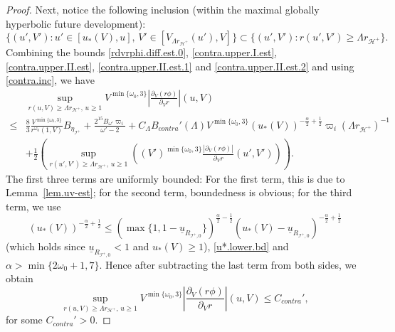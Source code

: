 \documentclass[10pt, reqno]{amsart}
\theoremstyle{definition}
\theoremstyle{remark}
\theoremstyle{conjecture}
\numberwithin{equation}{section}
\newcommand{\rd}{\partial}
\newcommand{\0}{\emptyset}
\newcommand{\alp}{\alpha}
\newcommand{\omg}{\omega}
\newcommand{\calH}{\mathcal H}
\newcommand{\calI}{\mathcal I}
\newcommand{\f}{\frac}
\newcommand{\EH}{\calH^{+}}
\newcommand{\NI}{\calI^{+}}						%
\newcommand{\ub}{\underline{u}}
\begin{document}
\begin{proof}
Next, notice the following inclusion (within the maximal globally hyperbolic future development):
\begin{equation}\label{contra.inc}
\{(u',V'): u'\in [u_*(V),u],\,V'\in [V_{\Lambda r_{\EH}}(u'),V]\} \subset \{(u',V'): r(u', V')\geq \Lambda r_{\EH}\}.
\end{equation}
Combining the bounds \eqref{rdvrphi.diff.est.0}, \eqref{contra.upper.I.est}, \eqref{contra.upper.II.est}, \eqref{contra.upper.II.est.1} and \eqref{contra.upper.II.est.2} and using \eqref{contra.inc}, we have
\begin{equation}
\begin{split}
&\sup_{r(u,V)\geq \Lambda r_{\EH},\, u\geq 1}V^{\min\{\omg_0, 3\}}\left|\f{\rd_V(r\phi)}{\rd_V r}\right|(u,V)\\
\leq& \f 83 \f{V^{\min\{\omg_0, 3\}}}{r^{\omg_0}(1,V)} B_{\eta_{\NI}}+\f{2^{15} B_{\omg'} \varpi_i }{\omg'-2}+ C_{\Lambda} B_{contra}'(\Lambda) V^{\min\{\omg_0,3\}} \left(u_*(V)\right)^{-\f{\alp}{2}+\f 12} \varpi_i (\Lambda r_{\EH})^{-1}\\
&+ \f 12\left(\sup_{r(u',V')\geq \Lambda r_{\EH},\, u\geq 1} \left((V')^{\min\{\omg_0,3\}}\f{|\rd_V(r\phi)|}{\rd_V r}(u',V')\right)\right).
\end{split}
\end{equation}
The first three terms are uniformly bounded: For the first term, this is due to Lemma~\ref{lem.uv-est}; for the second term, boundedness is obvious; for the third term, we use 
$$\left(u_*(V)\right)^{-\f{\alp}{2}+\f 12}\leq \left(\max\{1,1-\ub_{R_{\NI,0}}\}\right)^{\f{\alp}{2}-\f 12}\left(u_*(V)-\ub_{R_{\NI,0}}\right)^{-\f{\alp}{2}+\f 12}$$ 
(which holds since $\ub_{R_{\NI,0}}<1$ and $u_*(V)\geq 1$), \eqref{u*.lower.bd} and $\alp>\min\{2\omg_0+1, 7\}$. Hence after subtracting the last term from both sides, we obtain
\begin{equation}\label{contra.unif.rdvrphi.final}
\sup_{r(u,V)\geq \Lambda r_{\EH},\, u\geq 1}V^{\min\{\omg_0, 3\}}\left|\f{\rd_V(r\phi)}{\rd_V r}\right|(u,V)\leq C_{contra}',
\end{equation}
for some $C_{contra}'>0$.


\end{proof}
\end{document}
